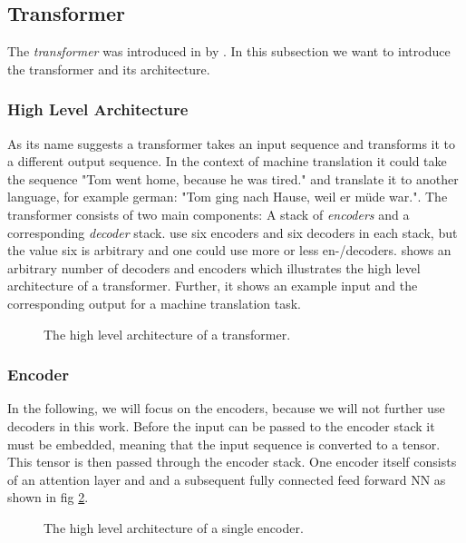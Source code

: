 
\subsection{Transformer}
\label{chp:fundamentals:sec:machine_learning:subsec:transformer}
The \textit{transformer} was introduced in \citeyear{Vaswani:2017} by \textcite{Vaswani:2017}.
In this subsection we want to introduce the transformer and its architecture.

\subsubsection{High Level Architecture}
As its name suggests a transformer takes an input sequence and transforms it to a different output sequence.
In the context of machine translation it could take the sequence "Tom went home, because he was tired." and translate it to another language, for example german: "Tom ging nach Hause, weil er müde war.".
The transformer consists of two main components: A stack of \textit{encoders} and a corresponding \textit{decoder} stack.
\Textcite{Vaswani:2017} use six encoders and six decoders in each stack, but the value six is arbitrary and one could use more or less en-/decoders.
 shows an arbitrary number of decoders and encoders which illustrates the high level architecture of a transformer.
Further, it shows an example input and the corresponding output for a machine translation task.
\begin{figure}[htpb]
    \centering
    
    \caption[High Level Transformer Architecture]{The high level architecture of a transformer.}\label{fig:fundamentals:machine_learning:transformer}
\end{figure}

\subsubsection{Encoder}
In the following, we will focus on the encoders, because we will not further use decoders in this work.
Before the input can be passed to the encoder stack it must be embedded, meaning that the input sequence is converted to a tensor.
This tensor is then passed through the encoder stack.
One encoder itself consists of an attention layer and and a subsequent fully connected feed forward \ac{NN} as shown in fig \cref{fig:fundamentals:machine_learning:encoder}.
\pagebreak %
\begin{figure}[htpb]
    \centering
    
    \caption[High Level Encoder Architecture]{The high level architecture of a single encoder.}\label{fig:fundamentals:machine_learning:encoder}
\end{figure}

